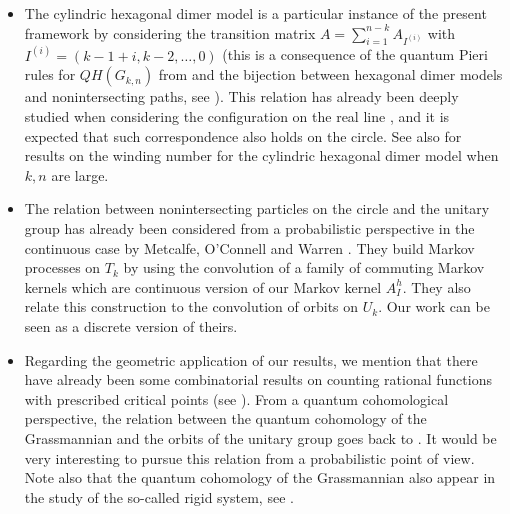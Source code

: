 \documentclass[10pt,11pt]{amsart}%
\begin{document}
\begin{itemize}
Beware that the stochastic processes studied above and in the present paper are different from the  the periodic TASEP with $k$ particles on a circle of size $n$: indeed, the TASEP is a continuous time Markov process whose transition matrix is given by the adjacency matrix of $B_{k,n}$, whereas our model is a discrete time Markov process whose Markov kernel is a Doob h-transform of this adjacency matrix. The two Markov processes have very different behaviors. For example, the stationary distribution of TASEP is the uniform distribution on $B_{k,n}$ whereas the stationary distribution of our model is given by $\mu^h(I)=\frac{\vert V(\xi_n(I))\vert^2}{n^k}$.
\item The cylindric hexagonal dimer model is a particular instance of the present framework by considering the transition matrix $A=\sum_{i=1}^{n-k}A_{I^{(i)}}$ with $I^{(i)}=(k-1+i,k-2,\ldots,0)$ (this is a consequence of the quantum Pieri rules for $QH(G_{k,n})$ from \cite[p.5]{B} and the bijection between hexagonal dimer models and nonintersecting paths, see \cite[Figure 1]{KW}). This relation has already been deeply studied when considering the configuration on the real line \cite{BG}, and it is expected that such correspondence also holds on the circle. See also \cite{BdT} for results on the winding number for the cylindric hexagonal dimer model when $k,n$ are large. 
\item The relation between nonintersecting particles on the circle and the unitary group has already been considered from a probabilistic perspective in the continuous case by Metcalfe, O'Connell and Warren \cite{MOW}. They build Markov processes on $T_k$ by using the convolution of a family of commuting Markov kernels which are continuous version of our Markov kernel $A_I^h$. They also relate this construction to the convolution of orbits on $U_k$. Our work can be seen as a discrete version of theirs.
\item Regarding the geometric application of our results, we mention that there have already been some combinatorial results on counting rational functions with prescribed critical points (see \cite{Sch}). From a quantum cohomological perspective, the relation between the quantum cohomology of the Grassmannian and the orbits of the unitary group goes back to \cite{Bel1}. It would be very interesting to pursue this relation from a probabilistic point of view. Note also that the quantum cohomology of the Grassmannian also appear in the study of the so-called rigid system, see \cite{Bel2}.
\end{itemize}
\end{document}
